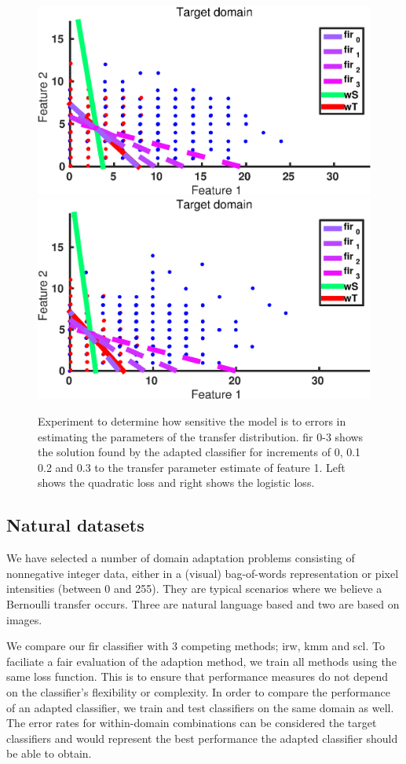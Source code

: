 \documentclass[twoside,11pt]{article}
\begin{document}
\begin{figure}[ht]
	\centering
	\includegraphics[width=.45\textwidth]{images/da_artexp_sens_params_square.eps} \hspace{5px}
	\includegraphics[width=.45\textwidth]{images/da_artexp_sens_params_log.eps} 
	\caption{Experiment to determine how sensitive the model is to errors in estimating the parameters of the transfer distribution. {\sc fir} 0-3 shows the solution found by the adapted classifier for increments of 0, 0.1 0.2 and 0.3 to the transfer parameter estimate of feature 1. Left shows the quadratic loss and right shows the logistic loss.}
	\label{sens_params}
\end{figure}

\subsection{Natural datasets}
We have selected a number of domain adaptation problems consisting of nonnegative integer data, either in a (visual) bag-of-words representation or pixel intensities (between 0 and 255). They are typical scenarios where we believe a Bernoulli transfer occurs. Three are natural language based and two are based on images.

We compare our {\sc fir} classifier with 3 competing methods; {\sc irw}, {\sc kmm} and {\sc scl}. To faciliate a fair evaluation of the adaption method, we train all methods using the same loss function. This is to ensure that performance measures do not depend on the classifier's flexibility or complexity. In order to compare the performance of an adapted classifier, we train and test classifiers on the same domain as well. The error rates for within-domain combinations can be considered the target classifiers and would represent the best performance the adapted classifier should be able to obtain.
\end{document}
